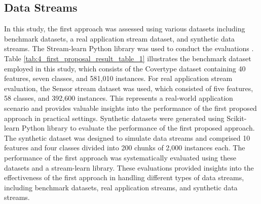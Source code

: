 \subsection{Data Streams}
In this study, the first approach was assessed using various datasets including benchmark datasets, a real application stream dataset, and synthetic data streams. The Stream-learn Python library was used to conduct the evaluations \cite{dries2009adaptive}. Table \ref{tab:4_first_proposal_result_table_1} illustrates the benchmark dataset employed in this study, which consists of the Covertype dataset containing 40 features, seven classes, and 581,010 instances. For real application stream evaluation, the Sensor stream dataset was used, which consisted of five features, 58 classes, and 392,600 instances. This represents a real-world application scenario and provides valuable insights into the performance of the first proposed approach in practical settings. Synthetic datasets were generated using Scikit-learn Python library to evaluate the performance of the first proposed approach. The synthetic dataset was designed to simulate data streams and comprised 10 features and four classes divided into 200 chunks of 2,000 instances each. The performance of the first approach was systematically evaluated using these datasets and a stream-learn library. These evaluations provided insights into the effectiveness of the first approach in handling different types of data streams, including benchmark datasets, real application streams, and synthetic data streams.

\begin{table}[h!]
  \centering
  \caption{Summary of Dataset Characteristics Utilized in the PA1 Experimental.}
  \label{tab:4_first_proposal_result_table_1}
  \end{table}

